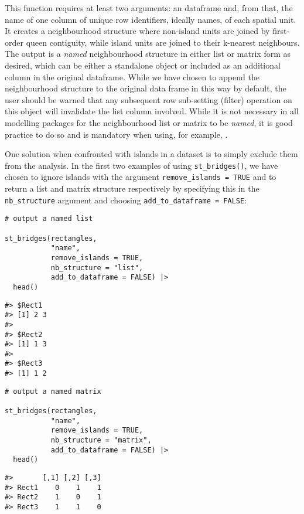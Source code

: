 This function requires at least two arguments: an  dataframe and, from that, the name of one column of unique row identifiers, ideally names, of each spatial unit. It creates a neighbourhood structure where non-island units are joined by first-order queen contiguity, while island units are joined to their k-nearest neighbours. The output is a \emph{named} neighbourhood structure in either list or matrix form as desired, which can be either a standalone object or included as an additional column in the original  dataframe. While we have chosen to append the neighbourhood structure to the original data frame in this way by default, the user should be warned that any subsequent row sub-setting (filter) operation on this object will invalidate the list column involved. While it is not necessary in all modelling packages for the neighbourhood list or matrix to be \emph{named}, it is good practice to do so and is mandatory when using, for example, .

One solution when confronted with islands in a dataset is to simply exclude them from the analysis. In the first two examples of using \texttt{st\_bridges()}, we have chosen to ignore islands with the argument \texttt{remove\_islands\ =\ TRUE} and to return a list and matrix structure respectively by specifying this in the \texttt{nb\_structure} argument and choosing \texttt{add\_to\_dataframe\ =\ FALSE}:

\begin{verbatim}
# output a named list

st_bridges(rectangles,
           "name",
           remove_islands = TRUE,
           nb_structure = "list",
           add_to_dataframe = FALSE) |>
  head()
\end{verbatim}

\begin{verbatim}
#> $Rect1
#> [1] 2 3
#> 
#> $Rect2
#> [1] 1 3
#> 
#> $Rect3
#> [1] 1 2
\end{verbatim}

\begin{verbatim}
# output a named matrix

st_bridges(rectangles,
           "name",
           remove_islands = TRUE,
           nb_structure = "matrix",
           add_to_dataframe = FALSE) |>
  head()
\end{verbatim}

\begin{verbatim}
#>       [,1] [,2] [,3]
#> Rect1    0    1    1
#> Rect2    1    0    1
#> Rect3    1    1    0
\end{verbatim}

